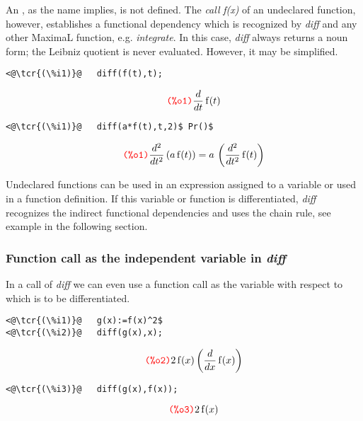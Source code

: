 \documentclass[../Maxima_Workbook.tex]{subfiles}
\begin{document}
An , as the name implies, is not defined. The \emph{call} \emph{f(x)} of an undeclared function, however, establishes a functional dependency which is recognized by \emph{diff} and any other MaximaL function, e.g. \emph{integrate}. In this case, \emph{diff} always returns a noun form; the Leibniz quotient is never evaluated. However, it may be simplified.

\lz \begin{small}
\color{blue} \leqn
\begin{lstlisting}
<@\tcr{(\%i1)}@   diff(f(t),t);
\end{lstlisting}
\vspace{-5mm} \[\tag*{\tcr{\ttfamily (\%o1)}} \frac{d}{d t} \operatorname{f}(t) \]
\vspace{-7mm} \begin{lstlisting}
<@\tcr{(\%i1)}@   diff(a*f(t),t,2)$ Pr()$
\end{lstlisting}
\vspace{-5mm} \[\tag*{\tcr{\ttfamily (\%o1)}} \frac{{{d}^{2}}}{d {{t}^{2}}} \left( a \operatorname{f}(t)\right)   =  a\, \left( \frac{{{d}^{2}}}{d {{t}^{2}}} \operatorname{f}(t)\right) \]
\color{black} \reqn
\end{small} \vspace{-4mm}

\lz Undeclared functions can be used in an expression assigned to a variable or used in a function definition. If this variable or function is differentiated, \emph{diff} recognizes the indirect functional dependencies and uses the chain rule, see example in the following section.

\subsubsection{Function call as the independent variable in \emph{diff}}\label{D3}

In a call of \emph{diff} we can even use a function call as the variable with respect to which is to be differentiated.

\lz \begin{small}
\color{blue} \leqn
\begin{lstlisting}
<@\tcr{(\%i1)}@   g(x):=f(x)^2$
<@\tcr{(\%i2)}@   diff(g(x),x);
\end{lstlisting}
\vspace{-5mm} \[\tag*{\tcr{\ttfamily (\%o2)}} 2 \operatorname{f}(x) \left( \frac{d}{d x} \operatorname{f}(x)\right) \]
\vspace{-7mm} \begin{lstlisting}
<@\tcr{(\%i3)}@   diff(g(x),f(x));
\end{lstlisting}
\vspace{-5mm} \[\tag*{\tcr{\ttfamily (\%o3)}} 2 \operatorname{f}(x) \]
\color{black} \reqn
\end{small} \vspace{-5mm}
\end{document}
